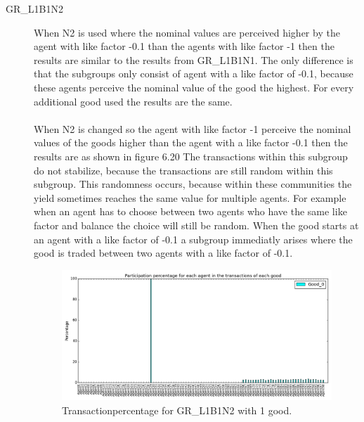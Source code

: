 \documentclass[twoside,openright]{uva-bachelor-thesis}
\begin{document}
\begin{description}
\clearpage
\item[GR\_L1B1N2] When N2 is used where the nominal values are perceived higher by the agent with like factor -0.1 than the agents with like factor -1 then the results are similar to the results from GR\_L1B1N1. The only difference is that the subgroups only consist of agent with a like factor of -0.1, because these agents perceive the nominal value of the good the highest. For every additional good used the results are the same.
\\
\\
When N2 is changed so the agent with like factor -1 perceive the nominal values of the goods higher than the agent with a like factor -0.1 then the results are as shown in figure 6.20  The transactions within this subgroup do not stabilize, because the transactions are still random within this subgroup. This randomness occurs, because within these communities the yield sometimes reaches the same value for multiple agents. For example when an agent has to choose between two agents who have the same like factor and balance the choice will still be random.
When the good starts at an agent with a like factor of -0.1 a subgroup immediatly arises where the good is traded between two agents with a like factor of -0.1.\\
\begin{figure}[h!]
  \centering
\includegraphics[scale=0.4]{Simulation_figures/GR_L1B1N2/321_1good} 
  \caption{Transactionpercentage for GR\_L1B1N2 with 1 good.}
\end{figure}



\end{description}
\end{document}

